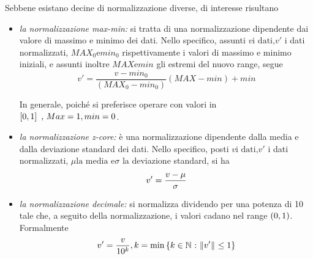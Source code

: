 \documentclass{subfiles}
\begin{document}
Sebbene esistano decine di normalizzazione diverse, di interesse risultano
\begin{itemize}
    \item \emph{la normalizzazione max-min:} si tratta di una normalizzazione dipendente dai valore di massimo e minimo dei dati.
          Nello specifico, assunti $v \text{i dati,} v' $ i dati normalizzati, $MAX_{0} \text{e} min_{0}$ rispettivamente i valori di massimo e minimo iniziali,
          e assunti inoltre $MAX \text{e} min$ gli estremi del nuovo range, segue
          $$
              v' = \frac{v - min_{0}}{(MAX_{0} - min_{0})}(MAX - min) + min
          $$
          \begin{MarginNote}
              In generale, poiché si preferisce operare con valori in \(\Range*{0}{1} \text{,} Max = 1, min = 0\).
          \end{MarginNote}

    \item \emph{la normalizzazione z-core:} è una normalizzazione dipendente dalla media e dalla deviazione standard dei dati.
          Nello specifico, posti $v \text{i dati,} v'$ i dati normalizzati, $\mu \text{la media e} \sigma$ la deviazione standard, si ha
          $$
              v' = \Frac{v - \mu}{\sigma}
          $$

    \item \emph{la normalizzazione decimale:} si normalizza dividendo per una potenza di 10 tale che,
          a seguito della normalizzazione, i valori cadano nel range $\Range{0}{1}$.
          Formalmente
          $$
              v' = \Frac{v}{10^{k}}, k = \Min{k \in \Natural}[\Norm{v'} \le 1]
          $$
\end{itemize}
\end{document}
